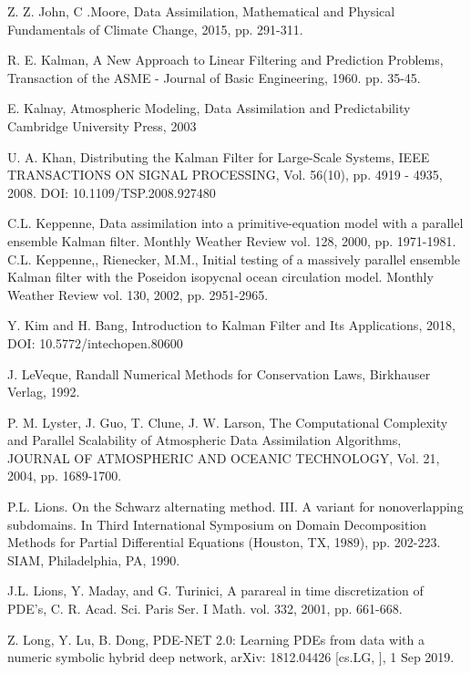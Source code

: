 \documentclass[smallcondensed]{svjour3}
\begin{document}
\begin{thebibliography}{99}
Z. Z. John, C .Moore, Data Assimilation,  Mathematical and Physical Fundamentals of Climate Change, 2015, pp. 291-311.


R. E. Kalman, A New Approach to Linear Filtering and Prediction
Problems, Transaction of the ASME - Journal of Basic Engineering, 1960. pp. 35-45.

 E. Kalnay,  Atmospheric Modeling, Data Assimilation and Predictability Cambridge University Press, 2003

 U. A. Khan, Distributing the Kalman Filter for
Large-Scale Systems, IEEE TRANSACTIONS ON SIGNAL PROCESSING, Vol. 56(10), pp. 4919 - 4935,  2008. DOI: 10.1109/TSP.2008.927480


  C.L. Keppenne,  Data assimilation into a primitive-equation model with a
parallel ensemble Kalman filter. Monthly Weather Review vol. 128, 2000, pp. 1971-1981.
   C.L. Keppenne,, Rienecker, M.M.,  Initial testing of a massively parallel
ensemble Kalman filter with the Poseidon isopycnal ocean circulation model.
Monthly Weather Review vol. 130, 2002, pp. 2951-2965.

 Y. Kim and H. Bang, Introduction to Kalman Filter and Its Applications, 2018,  DOI: 10.5772/intechopen.80600


 J. LeVeque, Randall Numerical Methods for Conservation Laws, Birkhauser Verlag, 1992.


  P. M. Lyster, J. Guo, T. Clune, J. W. Larson, The Computational Complexity and Parallel Scalability of Atmospheric Data Assimilation Algorithms, JOURNAL OF ATMOSPHERIC AND OCEANIC TECHNOLOGY, Vol. 21, 2004,  pp. 1689-1700.
 
 


  P.L. Lions. On the Schwarz alternating method. III. A variant for nonoverlapping subdomains. In Third International Symposium on Domain Decomposition Methods for Partial Differential Equations (Houston, TX, 1989), pp. 202-223. SIAM, Philadelphia, PA, 1990.

  J.L. Lions, Y. Maday, and G. Turinici, A parareal in time discretization of PDE's, C. R.
Acad. Sci. Paris Ser. I Math. vol. 332, 2001, pp. 661-668.




 Z. Long, Y. Lu, B. Dong,  PDE-NET 2.0: Learning PDEs from data with a numeric symbolic hybrid deep network, arXiv: 1812.04426 [cs.LG, ],  1 Sep 2019.


\end{thebibliography}
\end{document}
